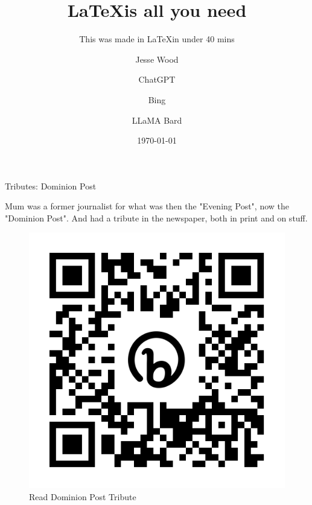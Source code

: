 \documentclass{beamer}
\title[\LaTeX] %
{\LaTeX is all you need}
\subtitle{This was made in \LaTeX in under 40 mins}
\author[jesse.wood@ecs.vuw.ac.nz] %
{Jesse Wood\inst{1}\orcidlink{0000-0003-3756-2122} \and
    ChatGPT \inst{1}\orcidlink{0000-0002-6930-6863} \and
    Bing \inst{1}\orcidlink{0000-0003-4463-9538} \and
    LLaMA \inst{3}\orcidlink{0000-0002-4898-6724}
    Bard\inst{4}\orcidlink{0000-0002-4865-8026} \and
}
\institute[] %
{
    \inst{1}%
    School of Engineering and Computer Science | Te Kura Mātai Pūkaha, Pūrorohiko
    Victoria University of Wellington | Te Herenga Waka
  
    \inst{2}%
    Open AI | United States: San Francisco: Poineer building, 3180 18th St, San Francisco

    \inst{3}%
    Meta AI | Menlo Park, California, headquarters, London, United Kingdom, 

    \inst{4}%
    Google AI | 340 Main Street, Los Angeles, CA 90291, United States
}
\date{\today} %
{
    \snapper \bluecod \gurnard \tarakihi 
}
\begin{document}

\frame{\titlepage}

\begin{frame}{Tributes: Dominion Post}
\vspace{0.2cm}

Mum was a former journalist for what was then the "Evening Post", now the "Dominion Post". And had a tribute in the newspaper, both in print and on stuff.

\vspace{1cm}

\begin{figure}
    \centering
    \includegraphics[height=0.3\textheight]{assets/qr/dominion_post_qr.png}
    \caption{Read Dominion Post Tribute}
    \label{fig:qr-code}
\end{figure}
\end{frame}
\end{document}
